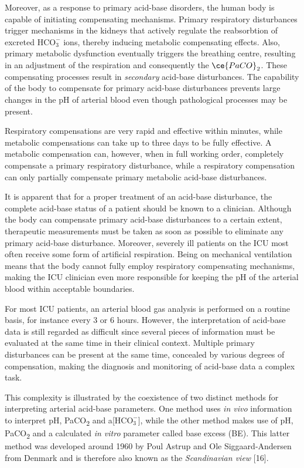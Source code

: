 \documentclass[
  12pt,
  a4paperpaper,
]{report}
\begin{document}
Moreover, as a response to primary acid-base disorders, the human body
is capable of initiating compensating mechanisms. Primary respiratory
disturbances trigger mechanisms in the kidneys that actively regulate
the reabsorbtion of excreted \(\text{HCO}_{3}^{-}\) ions, thereby
inducing metabolic compensating effects. Also, primary metabolic
dysfunction eventually triggers the breathing centre, resulting in an
adjustment of the respiration and consequently the \(\ce{PaCO}_{2}\).
These compensating processes result in \emph{secondary} acid-base
disturbances. The capability of the body to compensate for primary
acid-base disturbances prevents large changes in the pH of arterial
blood even though pathological processes may be present.

Respiratory compensations are very rapid and effective within minutes,
while metabolic compensations can take up to three days to be fully
effective. A metabolic compensation can, however, when in full working
order, completely compensate a primary respiratory disturbance, while a
respiratory compensation can only partially compensate primary metabolic
acid-base disturbances.

It is apparent that for a proper treatment of an acid-base disturbance,
the complete acid-base status of a patient should be known to a
clinician. Although the body can compensate primary acid-base
disturbances to a certain extent, therapeutic measurements must be taken
as soon as possible to eliminate any primary acid-base disturbance.
Moreover, severely ill patients on the ICU most often receive some form
of artificial respiration. Being on mechanical ventilation means that
the body cannot fully employ respiratory compensating mechanisms, making
the ICU clinician even more responsible for keeping the pH of the
arterial blood within acceptable boundaries.

For most ICU patients, an arterial blood gas analysis is performed on a
routine basis, for instance every 3 or 6 hours. However, the
interpretation of acid-base data is still regarded as difficult since
several pieces of information must be evaluated at the same time in
their clinical context. Multiple primary disturbances can be present at
the same time, concealed by various degrees of compensation, making the
diagnosis and monitoring of acid-base data a complex task.

This complexity is illustrated by the coexistence of two distinct
methods for interpreting arterial acid-base parameters. One method uses
\emph{in vivo} information to interpret pH,
Pa\textsc{CO}\textsubscript{2} and a{[}\(\text{HCO}_{3}^{-}\){]}, while
the other method makes use of pH, Pa\textsc{CO}\textsubscript{2} and a
calculated \emph{in vitro} parameter called base excess (BE). This
latter method was developed around 1960 by Poul Astrup and Ole
Siggaard-Andersen from Denmark and is therefore also known as the
\emph{Scandinavian view} {[}16{]}.
\end{document}
